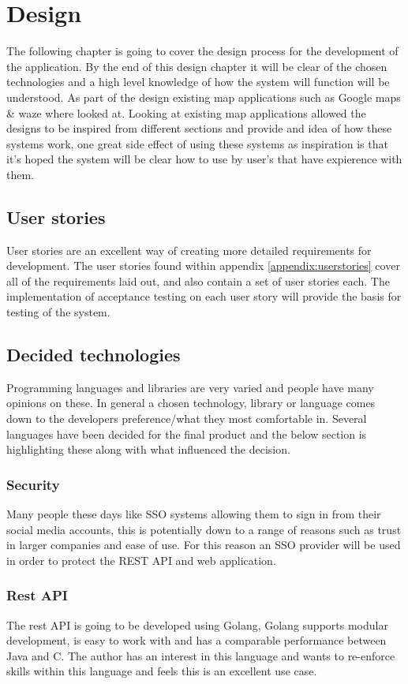 \section{Design}
The following chapter is going to cover the design process for the development of the application. By the end of this design chapter it will be clear of the chosen technologies and a high level knowledge of how the system will function will be understood. As part of the design existing map applications such as Google maps \& waze where looked at. Looking at existing map applications allowed the designs to be inspired from different sections and provide and idea of how these systems work, one great side effect of using these systems as inspiration is that it's hoped the system will be clear how to use by user's that have expierence with them.

\subsection{User stories}
User stories are an excellent way of creating more detailed requirements for development. The user stories found within appendix \ref{appendix:userstories} cover all of the requirements laid out, and also contain a set of user stories each. The implementation of acceptance testing on each user story will provide the basis for testing of the system.

\subsection{Decided technologies}
Programming languages and libraries are very varied and people have many opinions on these. In general a chosen technology, library or language comes down to the developers preference/what they most comfortable in. Several languages have been decided for the final product and the below section is highlighting these along with what influenced the decision.

\subsubsection{Security}
Many people these days like SSO systems allowing them to sign in from their social media accounts, this is potentially down to a range of reasons such as trust in larger companies and ease of use. For this reason an SSO provider will be used in order to protect the REST API and web application.

\subsubsection{Rest API}
The rest API is going to be developed using Golang, Golang supports modular development, is easy to work with and has a comparable performance between Java and C. The author has an interest in this language and wants to re-enforce skills within this language and feels this is an excellent use case.

